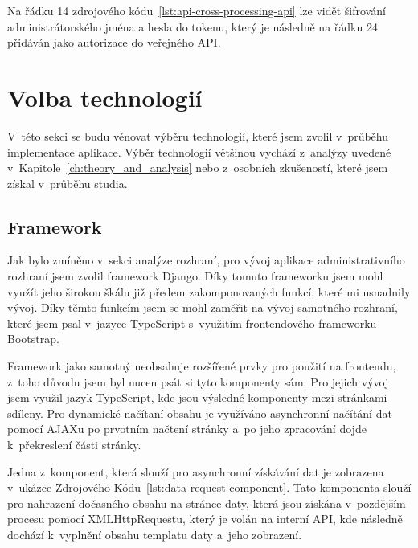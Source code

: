Na řádku 14 zdrojového kódu~\ref{lst:api-cross-processing-api} lze vidět šifrování administrátorského jména a hesla do tokenu, který je následně na řádku 24 přidáván jako autorizace do veřejného API\@.
\pagebreak




\section{Volba technologií}
\label{sec:implementation-technologies}
V~této sekci se budu věnovat výběru technologií, které jsem zvolil v~průběhu implementace aplikace. Výběr technologií většinou vychází z~analýzy uvedené v~Kapitole~\ref{ch:theory_and_analysis} nebo z~osobních zkušeností, které jsem získal v~průběhu studia.

\subsection{Framework}
\label{subsec:implementation-technologies-framework}
Jak bylo zmíněno v~sekci analýze rozhraní, pro vývoj aplikace administrativního rozhraní jsem zvolil framework Django. Díky tomuto frameworku jsem mohl využít jeho širokou škálu již předem zakomponovaných funkcí, které mi usnadnily vývoj. Díky těmto funkcím jsem se mohl zaměřit na vývoj samotného rozhraní, které jsem psal v~jazyce TypeScript s~využitím frontendového frameworku Bootstrap.

Framework jako samotný neobsahuje rozšířené prvky pro použití na frontendu, z~toho důvodu jsem byl nucen psát si tyto komponenty sám. Pro jejich vývoj jsem využil jazyk TypeScript, kde jsou výsledné komponenty mezi stránkami sdíleny. Pro dynamické načítaní obsahu je využíváno asynchronní načítání dat pomocí AJAXu po prvotním načtení stránky a~po jeho zpracování dojde k~překreslení části stránky.

Jedna z~komponent, která slouží pro asynchronní získávání dat je zobrazena v~ukázce Zdrojového Kódu~\ref{lst:data-request-component}. Tato komponenta slouží pro nahrazení dočasného obsahu na stránce daty, která jsou získána v~pozdějším procesu pomocí XMLHttpRequestu, který je volán na interní API, kde následně dochází k~vyplnění obsahu templatu daty a~jeho zobrazení.

